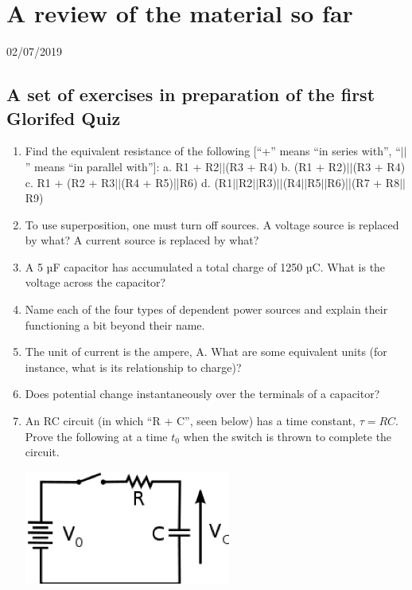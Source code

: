 \documentclass[11pt]{book}
\begin{document}
\chapter{A review of the material so far}
02/07/2019 

\section{A set of exercises in preparation of the first Glorifed Quiz}

\begin{enumerate}
	\item Find the equivalent resistance of the following [``+'' means ``in series with'', ``$\vert\vert$'' means ``in parallel with'']:
	\subitem a.	R1 + R2$\vert\vert$(R3 + R4)
	\subitem b.	(R1 + R2)$\vert\vert$(R3 + R4)
	\subitem c.	R1 + (R2 + R3$\vert\vert$(R4 + R5)||R6)
	\subitem d.	(R1$\vert\vert$R2$\vert\vert$R3)$\vert\vert$(R4$\vert\vert$R5$\vert\vert$R6)||(R7 + R8$\vert\vert$R9)
	\item To use superposition, one must turn off sources. A voltage source is replaced by what? A current source is replaced by what?
	\item A 5 µF capacitor has accumulated a total charge of 1250 µC. What is the voltage across the capacitor?
	\item Name each of the four types of dependent power sources and explain their functioning a bit beyond their name.
	\item The unit of current is the ampere, A. What are some equivalent units (for instance, what is its relationship to charge)?
	\item Does potential change instantaneously over the terminals of a capacitor?
	\item An RC circuit (in which ``R + C'', seen below) has a time constant, $\tau = RC$. Prove the following at a time $t_0$ when the switch is thrown to complete the circuit.
	
	\begin{center}\includegraphics{figures/q1.01.png}\end{center}
	

\end{enumerate}
\end{document}
